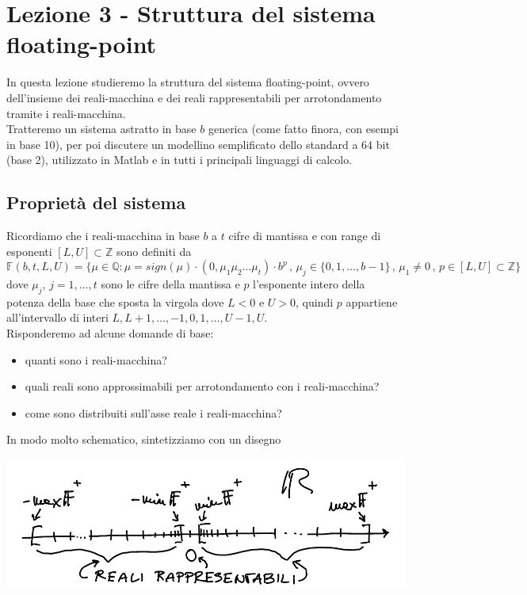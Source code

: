 \section{Lezione 3 - Struttura del sistema floating-point}
In questa lezione studieremo la struttura del sistema floating-point, ovvero dell'insieme dei reali-macchina e dei reali rappresentabili per arrotondamento tramite i reali-macchina.\\
Tratteremo un sistema astratto in base $b$ generica (come fatto finora, con esempi in base 10), per poi discutere un modellino semplificato dello standard a 64 bit (base 2), utilizzato in Matlab e in tutti i principali linguaggi di calcolo.

\subsection{Proprietà del sistema}
Ricordiamo che i reali-macchina in base $b$ a $t$ cifre di mantissa e con range di esponenti $[L,U] \subset \mathbb{Z}$ sono definiti da
\[ \mathbb{F}(b, t, L, U) = \{ \mu \in \mathbb{Q} : \mu = sign(\mu)\cdot (0,\mu_1 \mu_2 \dotsc \mu_t) \cdot b^p \,,\, \mu_j \in \{ 0, 1, \dotsc, b-1 \} \,,\, \mu_1 \ne 0 \,,\, p \in [L,U] \subset \mathbb{Z} \} \]
dove $\mu_j$, $j = 1, \dotsc, t$ sono le cifre della mantissa e $p$ l'esponente intero della potenza della base che sposta la virgola dove $L<0$ e $U>0$, quindi $p$ appartiene all'intervallo di interi $L, L+1, \dotsc, -1, 0, 1, \dotsc, U-1, U$.\\
Risponderemo ad alcune domande di base:
\begin{itemize}
    \item quanti sono i reali-macchina?
    \item quali reali sono approssimabili per arrotondamento con i reali-macchina?
    \item come sono distribuiti sull'asse reale i reali-macchina?
\end{itemize}
In modo molto schematico, sintetizziamo con un disegno 
\begin{center}
    \includegraphics[scale=0.65]{foto/img2}
\end{center}
